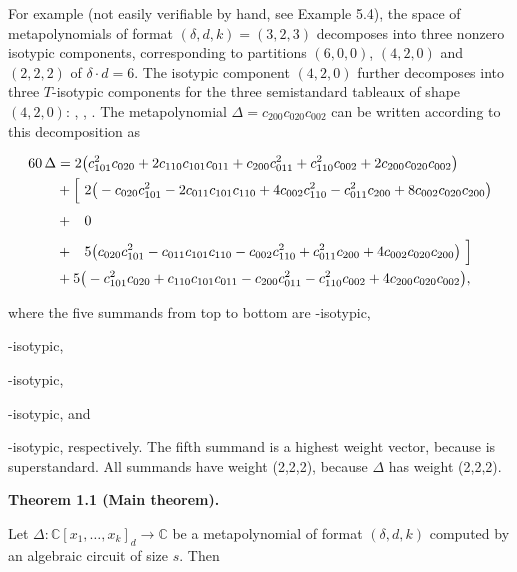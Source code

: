 \documentclass[10pt,a4paper]{article}
\begin{document}
For example (not easily verifiable by hand, see Example 5.4), the space of metapolynomials of format $(\delta,d,k)=(3,2,3)$ decomposes into three nonzero isotypic components, corresponding to partitions $(6,0,0)$, $(4,2,0)$ and $(2,2,2)$ of $\delta\cdot d=6$. The isotypic component $(4,2,0)$ further decomposes into three $T$-isotypic components for the three semistandard tableaux of shape $(4,2,0)$: 
, 
, 
. The metapolynomial $\Delta=c_{200}c_{020}c_{002}$ can be written according to this decomposition as



\[\begin{aligned}
\displaystyle 60\,\Delta & \displaystyle= \displaystyle 2\big{(}c_{101}^{2}c_{020}+2c_{110}c_{101}c_{011}+c_{200}c_{011}^{2}+c_{110}^{2}c_{002}+2c_{200}c_{020}c_{002}\big{)} \\
 & \displaystyle+ \displaystyle\Big{[}\ 2\big{(}-c_{020}c_{101}^{2}-2c_{011}c_{101}c_{110}+4c_{002}c_{110}^{2}-c_{011}^{2}c_{200}+8c_{002}c_{020}c_{200}\big{)} \\
 & \displaystyle+ \displaystyle\phantom{\Big{[}\ }0 \\
 & \displaystyle+ \displaystyle\phantom{\Big{[}\ }5\big{(}c_{020}c_{101}^{2}-c_{011}c_{101}c_{110}-c_{002}c_{110}^{2}+c_{011}^{2}c_{200}+4c_{002}c_{020}c_{200}\big{)}\ \Big{]} \\
 & \displaystyle+ \displaystyle 5\big{(}-c_{101}^{2}c_{020}+c_{110}c_{101}c_{011}-c_{200}c_{011}^{2}-c_{110}^{2}c_{002}+4c_{200}c_{020}c_{002}\big{)},
\end{aligned}\]


where the five summands from top to bottom are 
-isotypic,

-isotypic,

-isotypic,

-isotypic,
and

-isotypic, respectively.
The fifth summand is a highest weight vector, because 
is superstandard.
All summands have weight (2,2,2), because $\Delta$ has weight (2,2,2).





\par\medskip\noindent\textbf{Theorem 1.1 (Main theorem).}\par



Let $\Delta\colon\mathbb{C}[x_{1},\dots,x_{k}]_{d}\to\mathbb{C}$ be a metapolynomial of format $(\delta,d,k)$ computed by an algebraic circuit of size $s$.
Then
\end{document}
